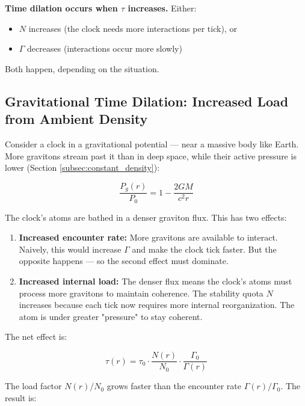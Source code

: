 \documentclass[12pt, a4paper]{article}
\begin{document}
\textbf{Time dilation occurs when \( \tau \) increases.} Either:
\begin{itemize}
    \item \( N \) increases (the clock needs more interactions per tick), or
    \item \( \Gamma \) decreases (interactions occur more slowly)
\end{itemize}

Both happen, depending on the situation.

\subsection{Gravitational Time Dilation: Increased Load from Ambient Density}
\label{subsec:gravitational_dilation}

Consider a clock in a gravitational potential — near a massive body like Earth. More gravitons stream past it than in deep space, while their active pressure is lower (Section \ref{subsec:constant_density}):

\[
\frac{P_g(r)}{P_0} = 1 - \frac{2GM}{c^2 r}
\]

The clock's atoms are bathed in a denser graviton flux. This has two effects:

\begin{enumerate}
    \item \textbf{Increased encounter rate:} More gravitons are available to interact. Naively, this would increase \( \Gamma \) and make the clock tick faster. But the opposite happens — so the second effect must dominate.
    
    \item \textbf{Increased internal load:} The denser flux means the clock's atoms must process more gravitons to maintain coherence. The stability quota \( N \) increases because each tick now requires more internal reorganization. The atom is under greater "pressure" to stay coherent.
\end{enumerate}

The net effect is:

\[
\tau(r) = \tau_0 \cdot \frac{N(r)}{N_0} \cdot \frac{\Gamma_0}{\Gamma(r)}
\]

The load factor \( N(r)/N_0 \) grows faster than the encounter rate \( \Gamma(r)/\Gamma_0 \).  The result is:
\end{document}
